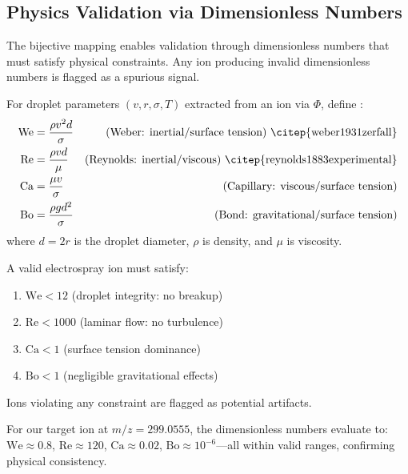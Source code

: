 \subsection{Physics Validation via Dimensionless Numbers}

The bijective mapping enables validation through dimensionless numbers that must satisfy physical constraints. Any ion producing invalid dimensionless numbers is flagged as a spurious signal.

\begin{definition}
For droplet parameters $(v, r, \sigma, T)$ extracted from an ion via $\Phi$, define \citep{batchelor2000introduction}:
\begin{align}
\text{We} &= \frac{\rho v^2 d}{\sigma} & \text{(Weber: inertial/surface tension) \citep{weber1931zerfall}} \\
\text{Re} &= \frac{\rho v d}{\mu} & \text{(Reynolds: inertial/viscous) \citep{reynolds1883experimental}} \\
\text{Ca} &= \frac{\mu v}{\sigma} & \text{(Capillary: viscous/surface tension)} \\
\text{Bo} &= \frac{\rho g d^2}{\sigma} & \text{(Bond: gravitational/surface tension)}
\end{align}
where $d = 2r$ is the droplet diameter, $\rho$ is density, and $\mu$ is viscosity.
\end{definition}

\begin{theorem}
A valid electrospray ion \citep{fenn1989electrospray,kebarle2009electrospray} must satisfy:
\begin{enumerate}
\item $\text{We} < 12$ (droplet integrity: no breakup)
\item $\text{Re} < 1000$ (laminar flow: no turbulence)
\item $\text{Ca} < 1$ (surface tension dominance)
\item $\text{Bo} < 1$ (negligible gravitational effects)
\end{enumerate}
Ions violating any constraint are flagged as potential artifacts.
\end{theorem}

For our target ion at $m/z = 299.0555$, the dimensionless numbers evaluate to: $\text{We} \approx 0.8$, $\text{Re} \approx 120$, $\text{Ca} \approx 0.02$, $\text{Bo} \approx 10^{-6}$---all within valid ranges, confirming physical consistency.

